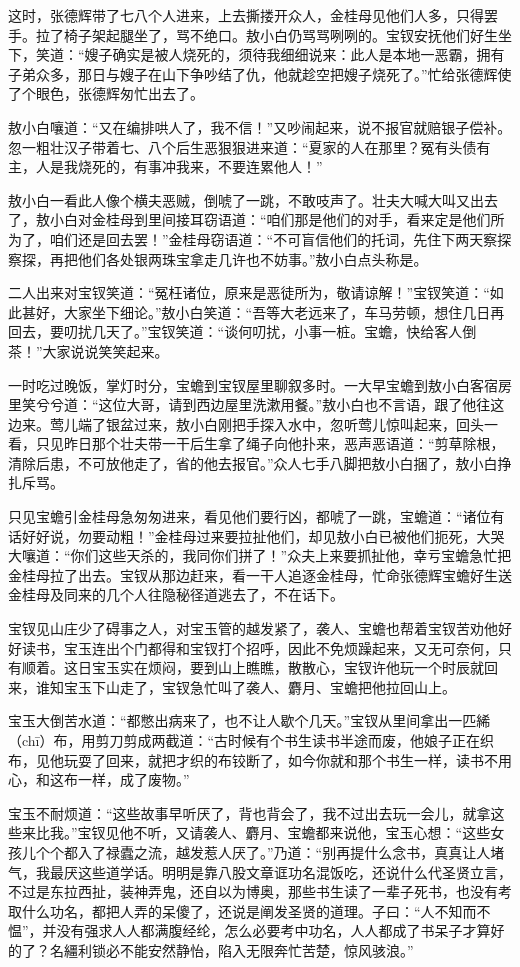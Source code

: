 \documentclass[12pt,oneside]{book}
\begin{document}
这时，张德辉带了七八个人进来，上去撕搂开众人，金桂母见他们人多，只得罢手。拉了椅子架起腿坐了，骂不绝口。敖小白仍骂骂咧咧的。宝钗安抚他们好生坐下，笑道：“嫂子确实是被人烧死的，须待我细细说来：此人是本地一恶霸，拥有子弟众多，那日与嫂子在山下争吵结了仇，他就趁空把嫂子烧死了。”忙给张德辉使了个眼色，张德辉匆忙出去了。

敖小白嚷道：“又在编排哄人了，我不信！”又吵闹起来，说不报官就赔银子偿补。忽一粗壮汉子带着七、八个后生恶狠狠进来道：“夏家的人在那里？冤有头债有主，人是我烧死的，有事冲我来，不要连累他人！”

敖小白一看此人像个横夫恶贼，倒唬了一跳，不敢吱声了。壮夫大喊大叫又出去了，敖小白对金桂母到里间接耳窃语道：“咱们那是他们的对手，看来定是他们所为了，咱们还是回去罢！”金桂母窃语道：“不可盲信他们的托词，先住下两天察探察探，再把他们各处银两珠宝拿走几许也不妨事。”敖小白点头称是。

二人出来对宝钗笑道：“冤枉诸位，原来是恶徒所为，敬请谅解！”宝钗笑道：“如此甚好，大家坐下细论。”敖小白笑道：“吾等大老远来了，车马劳顿，想住几日再回去，要叨扰几天了。”宝钗笑道：“谈何叨扰，小事一桩。宝蟾，快给客人倒茶！”大家说说笑笑起来。

一时吃过晚饭，掌灯时分，宝蟾到宝钗屋里聊叙多时。一大早宝蟾到敖小白客宿房里笑兮兮道：“这位大哥，请到西边屋里洗漱用餐。”敖小白也不言语，跟了他往这边来。莺儿端了银盆过来，敖小白刚把手探入水中，忽听莺儿惊叫起来，回头一看，只见昨日那个壮夫带一干后生拿了绳子向他扑来，恶声恶语道：“剪草除根，清除后患，不可放他走了，省的他去报官。”众人七手八脚把敖小白捆了，敖小白挣扎斥骂。

只见宝蟾引金桂母急匆匆进来，看见他们要行凶，都唬了一跳，宝蟾道：“诸位有话好好说，勿要动粗！”金桂母过来要拉扯他们，却见敖小白已被他们扼死，大哭大嚷道：“你们这些天杀的，我同你们拼了！”众夫上来要抓扯他，幸亏宝蟾急忙把金桂母拉了出去。宝钗从那边赶来，看一干人追逐金桂母，忙命张德辉宝蟾好生送金桂母及同来的几个人往隐秘径道逃去了，不在话下。

宝钗见山庄少了碍事之人，对宝玉管的越发紧了，袭人、宝蟾也帮着宝钗苦劝他好好读书，宝玉连出个门都得和宝钗打个招呼，因此不免烦躁起来，又无可奈何，只有顺着。这日宝玉实在烦闷，要到山上瞧瞧，散散心，宝钗许他玩一个时辰就回来，谁知宝玉下山走了，宝钗急忙叫了袭人、麝月、宝蟾把他拉回山上。

宝玉大倒苦水道：“都憋出病来了，也不让人歇个几天。”宝钗从里间拿出一匹絺（chī）布，用剪刀剪成两截道：“古时候有个书生读书半途而废，他娘子正在织布，见他玩耍了回来，就把才织的布铰断了，如今你就和那个书生一样，读书不用心，和这布一样，成了废物。”

宝玉不耐烦道：“这些故事早听厌了，背也背会了，我不过出去玩一会儿，就拿这些来比我。”宝钗见他不听，又请袭人、麝月、宝蟾都来说他，宝玉心想：“这些女孩儿个个都入了禄蠹之流，越发惹人厌了。”乃道：“别再提什么念书，真真让人堵气，我最厌这些道学话。明明是靠八股文章诓功名混饭吃，还说什么代圣贤立言，不过是东拉西扯，装神弄鬼，还自以为博奥，那些书生读了一辈子死书，也没有考取什么功名，都把人弄的呆傻了，还说是阐发圣贤的道理。子曰：“人不知而不愠”，并没有强求人人都满腹经纶，怎么必要考中功名，人人都成了书呆子才算好的了？名繮利锁必不能安然静怡，陷入无限奔忙苦楚，惊风骇浪。”
\end{document}
